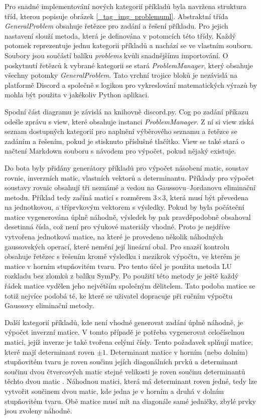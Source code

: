 \documentclass[FM]{tulthesis}
\begin{document}
	Pro snadné implementování nových kategorií příkladů byla navržena struktura tříd, kterou popisuje obrázek \ref{_tag_img_problemuml}. Abstraktní třída \textit{GeneralProblem} obsahuje řetězce pro zadání a řešení příkladu. Pro jejich nastavení slouží metoda, která je definována v potomcích této třídy. Každý potomek reprezentuje jednu kategorii příkladů a nachází se ve vlastním souboru. Soubory jsou součástí balíku \textit{problems} kvůli snadnějšímu importování. O poskytnutí řetězců k vybrané kategorii se stará \mbox{\textit{ProblemManager}}, který obsahuje všechny potomky \textit{GeneralProblem}. Tato vrchní trojice bloků je nezávislá na platformě Discord a společně s logikou pro vykreslování matematických výrazů by mohla být použita v jakékoliv Python aplikaci.
	
	Spodní část diagramu je závislá na knihovně discord.py. Cog po zadání příkazu odešle zprávu s view, které obsahuje instanci \textit{ProblemManager}. Z ní si view získá seznam dostupných kategorií pro naplnění výběrového seznamu a řetězce se zadáním a řešením, pokud je stisknuto příslušné tlačítko. View se také stará o načtení Markdown souboru s návodem pro výpočet, pokud nějaký existuje.
	
	Do bota byly přidány generátory příkladů pro výpočet násobení matic, soustav rovnic, inverzních matic, vlastních vektorů a determinantu. Příklady pro výpočet soustavy rovnic obsahují tři neznámé a vedou na Gaussovu–Jordanovu eliminační metodu. Příklad tedy začíná maticí s rozměrem 3$\times$3, která musí být převedena na jednotkovou, a tříprvkovým vektorem s výsledky. Pokud by byla počáteční matice vygenerována úplně náhodně, výsledek by pak pravděpodobně obsahoval desetinná čísla, což není pro výukové materiály vhodné. Proto je nejdříve vytvořena jednotková matice, na které je provedeno několik náhodných gaussovských operací, které nemění její lineární obal. Pro snazší kontrolu obsahuje řetězec s řešením kromě výsledku i mezikrok výpočtu, ve kterém je matice v horním stupňovitém tvaru. Pro tento účel je použita metoda LU rozkladu bez zlomků z balíku SymPy. Po použití této metody je ještě každý řádek matice vydělen jeho největším společným dělitelem. Tato podoba matice se totiž nejvíce podobá té, ke které se uživatel dopracuje při ručním výpočtu Gaussovy eliminační metody.
	
	Další kategorií příkladů, kde není vhodné generovat zadání úplně náhodně, je výpočet inverzní matice. V tomto případě je potřeba vygenerovat celočíselnou matici, jejíž inverze je také tvořena celými čísly. Tento požadavek splňují matice, které mají determinant roven $\pm1$. Determinant matice v horním (nebo dolním) stupňovitém tvaru je roven součinu jejích diagonálních prvků a determinant součinu dvou čtvercových matic stejné velikosti je roven součinu determinantů těchto dvou matic \cite{lit_lingebra}. Náhodnou matici, která má determinant roven jedné, tedy lze vytvořit součinem dvou matic, kde jedna je v horním a druhá v dolním stupňovitém tvaru. Obě matice musí mít na diagonále samé jedničky, zbylé prvky jsou zvoleny náhodně.
	
\end{document}
